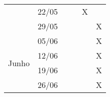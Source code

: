 \begin{table}[h]
\begin{tabular}{|cc|c|c|c|c|}
\multicolumn{1}{|c|}{}                          & 22/05  &   &   & X &   \\ \cline{2-6}
\multicolumn{1}{|c|}{}                          & 29/05  &   &   &   & X \\ \hline
\multicolumn{1}{|c|}{\multirow{4}{*}{Junho}}    & 05/06  &   &   &   & X \\ \cline{2-6}
\multicolumn{1}{|c|}{}                          & 12/06  &   &   &   & X \\ \cline{2-6}
\multicolumn{1}{|c|}{}                          & 19/06  &   &   &   & X \\ \cline{2-6}
\multicolumn{1}{|c|}{}                          & 26/06  &   &   &   & X \\ \hline
\end{tabular}
\end{table}